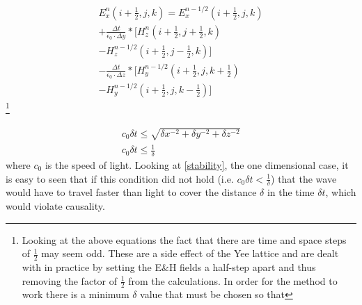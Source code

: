 \documentclass[twocolumn]{article}
\begin{document}
\begin{multline} \label{Ex}
E_x^{n}(i+\frac{1}{2},j,k)=E_x^{n-1/2}(i+\frac{1}{2},j,k)\\
+\frac{\Delta{t}}{\epsilon_0\cdot\Delta{y}}*[H_z^n(i+\frac{1}{2},j+\frac{1}{2},k)\\
-H_z^{n-1/2}(i+\frac{1}{2},j-\frac{1}{2},k)]\\
-\frac{\Delta{t}}{\epsilon_0\cdot\Delta{z}}*[H_y^{n-1/2}(i+\frac{1}{2},j,k+\frac{1}{2})\\
-H_y^{n-1/2}(i+\frac{1}{2},j,k-\frac{1}{2})]
\end{multline}
\footnote{Looking at the above equations the fact that there are time and space steps of
  $\frac{1}{2}$ may seem odd. These are a side effect of the Yee lattice and are dealt with in
  practice by setting the E\&H fields a half-step apart and thus removing the factor of
  $\frac{1}{2}$ from the calculations.  In order for the method to work there is a minimum $\delta$
  value that must be chosen so that}

\begin{subequations}\label{step-size}
\begin{align}
c_0\delta{t}\leq\sqrt{\delta{x^{-2}}+\delta{y^{-2}}+\delta{z^{-2}}}\\
c_0\delta{t}\leq\frac{1}{\delta}\label{stability}
\end{align}
\end{subequations}
where $c_0$ is the speed of light. Looking at \eqref{stability}, the one dimensional case, it is
easy to seen that if this condition did not hold (i.e. $c_0\delta{t}<\frac{1}{\delta}$) that the
wave would have to travel faster than light to cover the distance $\delta$ in the time $\delta{t}$,
which would violate causality.
\end{document}
